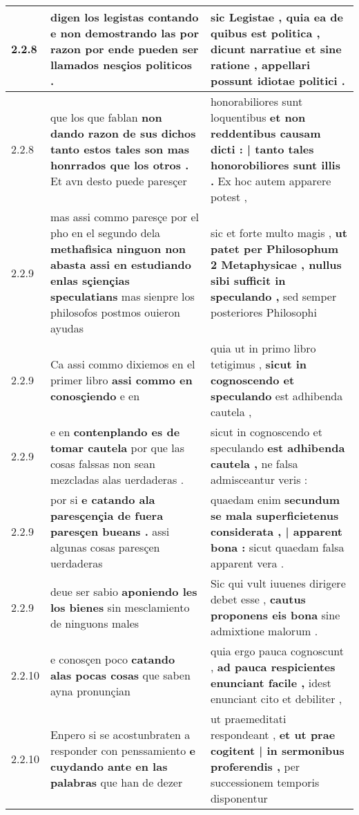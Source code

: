 \begin{tabular}{|p{1cm}|p{6.5cm}|p{6.5cm}|}
2.2.8 & digen los legistas contando \textbf{ e non demostrando las } por razon por ende pueden ser llamados nesçios politicos . & sic Legistae , quia ea de quibus est politica , \textbf{ dicunt narratiue et sine ratione , } appellari possunt idiotae politici . \\\hline
2.2.8 & que los que fablan \textbf{ non dando razon de sus dichos tanto estos tales son mas honrrados que los otros . } Et avn desto puede paresçer & honorabiliores sunt loquentibus \textbf{ et non reddentibus causam dicti : | tanto tales honorobiliores sunt illis . } Ex hoc autem apparere potest , \\\hline
2.2.9 & mas assi commo paresçe por el pho en el segundo dela \textbf{ methafisica ninguon non abasta assi en estudiando enlas sçiençias speculatians } mas sienpre los philosofos postmos ouieron ayudas & sic et forte multo magis , \textbf{ ut patet per Philosophum 2 Metaphysicae , nullus sibi sufficit in speculando , } sed semper posteriores Philosophi \\\hline
2.2.9 & Ca assi commo dixiemos en el primer libro \textbf{ assi commo en conosçiendo } e en & quia ut in primo libro tetigimus , \textbf{ sicut in cognoscendo et speculando } est adhibenda cautela , \\\hline
2.2.9 & e en \textbf{ contenplando es de tomar cautela } por que las cosas falssas non sean mezcladas alas uerdaderas . & sicut in cognoscendo et speculando \textbf{ est adhibenda cautela , } ne falsa admisceantur veris : \\\hline
2.2.9 & por si \textbf{ e catando ala paresçençia de fuera paresçen bueans . } assi algunas cosas paresçen uerdaderas & quaedam enim \textbf{ secundum se mala superficietenus considerata , | apparent bona : } sicut quaedam falsa apparent vera . \\\hline
2.2.9 & deue ser sabio \textbf{ aponiendo les los bienes } sin mesclamiento de ninguons males & Sic qui vult iuuenes dirigere debet esse , \textbf{ cautus proponens eis bona } sine admixtione malorum . \\\hline
2.2.10 & e conosçen poco \textbf{ catando alas pocas cosas } que saben ayna pronunçian & quia ergo pauca cognoscunt , \textbf{ ad pauca respicientes enunciant facile , } idest enunciant cito et debiliter , \\\hline
2.2.10 & Enpero si se acostunbraten a responder con penssamiento \textbf{ e cuydando ante en las palabras } que han de dezer & ut praemeditati respondeant , \textbf{ et ut prae cogitent | in sermonibus proferendis , } per successionem temporis disponentur \\\hline

\end{tabular}
